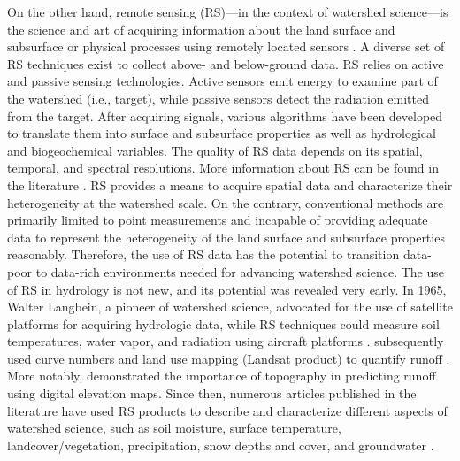 \documentclass[preprint,review, 12pt]{elsarticle}
\begin{document}
On the other hand, remote sensing (RS)—in the context of watershed science—is the science and art of acquiring information about the land surface and subsurface or physical processes using remotely located sensors \cite{ritchie1996remote}. A diverse set of RS techniques exist to collect above- and below-ground data. RS relies on active and passive sensing technologies. Active sensors emit energy to examine part of the watershed (i.e., target), while passive sensors detect the radiation emitted from the target. After acquiring signals, various algorithms have been developed to translate them into surface and subsurface properties as well as hydrological and biogeochemical variables. The quality of RS data depends on its spatial, temporal, and spectral resolutions. More information about RS can be found in the literature \cite{Arora2019,  entekhabi2010soil, fonstad2013topographic, li2008effect, turner2004scaling,  zhang2003progressive}. RS provides a means to acquire spatial data and characterize their heterogeneity at the watershed scale. On the contrary, conventional methods are primarily limited to point measurements and incapable of providing adequate data to represent the heterogeneity of the land surface and subsurface properties reasonably. Therefore, the use of RS data has the potential to transition data-poor to data-rich environments needed for advancing watershed science. The use of RS in hydrology is not new, and its potential was revealed very early. In 1965, Walter Langbein, a pioneer of watershed science, advocated for the use of satellite platforms for acquiring hydrologic data, while RS techniques could measure soil temperatures, water vapor, and radiation using aircraft platforms \citep{Langbein1965}. \citet{ragan1980runoff} subsequently used curve numbers and land use mapping (Landsat product) to quantify runoff \citep{ragan1980runoff}. More notably, \citet{beven1979physically} demonstrated the importance of topography in predicting runoff using digital elevation maps. Since then, numerous articles published in the literature have used RS products to describe and characterize different aspects of watershed science, such as soil moisture, surface temperature, landcover/vegetation, precipitation, snow depths and cover, and groundwater \citep{fonstad2013topographic, hutengs2016downscaling, li2008effect}. 
\end{document}
